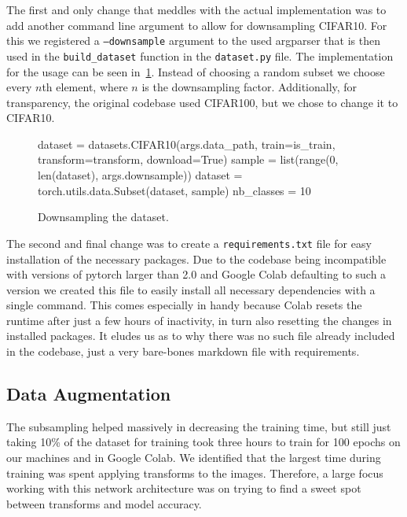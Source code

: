 \documentclass{article}
\begin{document}
    The first and only change that meddles with the actual implementation was to add another command line argument to allow for downsampling CIFAR10.
    For this we registered a \texttt{--downsample} argument to the used argparser that is then used in the \verb|build_dataset| function in the \texttt{dataset.py} file.
    The implementation for the usage can be seen in~\ref{fig:downsampling}.
    Instead of choosing a random subset we choose every $n$th element, where $n$ is the downsampling factor.
    Additionally, for transparency, the original codebase used CIFAR100, but we chose to change it to CIFAR10.
    \begin{figure}[h]
        \begin{python}
            dataset = datasets.CIFAR10(args.data_path, train=is_train,
            transform=transform, download=True)
            sample = list(range(0, len(dataset), args.downsample))
            dataset = torch.utils.data.Subset(dataset, sample)
            nb_classes = 10
        \end{python}
        \caption{Downsampling the dataset.}
        \label{fig:downsampling}
    \end{figure}

    The second and final change was to create a \texttt{requirements.txt} file for easy installation of the necessary packages.
    Due to the codebase being incompatible with versions of pytorch larger than 2.0 and Google Colab defaulting to such a version we created this file to easily install all necessary dependencies with a single command.
    This comes especially in handy because Colab resets the runtime after just a few hours of inactivity, in turn also resetting the changes in installed packages.
    It eludes us as to why there was no such file already included in the codebase, just a very bare-bones markdown file with requirements.

    \subsection{Data Augmentation}\label{subsec:data-augmentation}
    The subsampling helped massively in decreasing the training time, but still just taking 10\% of the dataset for training took three hours to train for 100 epochs on our machines and in Google Colab.
    We identified that the largest time during training was spent applying transforms to the images.
    Therefore, a large focus working with this network architecture was on trying to find a sweet spot between transforms and model accuracy.
\end{document}
